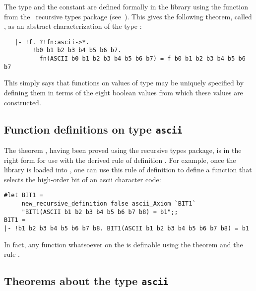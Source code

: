 The type  and the constant  are defined formally in the
library using the function  from the \HOL\ recursive types
package (see~\cite{description,melham}).  This gives the following theorem,
called , as an
abstract characterization of the type :

\begin{hol}
\begin{verbatim}
   |- !f. ?!fn:ascii->*.
        !b0 b1 b2 b3 b4 b5 b6 b7.
          fn(ASCII b0 b1 b2 b3 b4 b5 b6 b7) = f b0 b1 b2 b3 b4 b5 b6 b7
\end{verbatim}\end{hol}

\noindent This simply says that functions on values of type  may be
uniquely specified by defining them in terms of the eight boolean values from
which these values are constructed. 

\subsection{Function definitions on type {\tt ascii}}%

The theorem , having been proved using the recursive types
package, is in the right form for use with the derived rule of definition
.  For example, once the  library is
loaded into \HOL, one can use this rule of definition to define a function that
selects the high-order bit of an ascii character code:

\setcounter{sessioncount}{1}
\begin{session}\begin{verbatim}
#let BIT1 = 
     new_recursive_definition false ascii_Axiom `BIT1` 
     "BIT1(ASCII b1 b2 b3 b4 b5 b6 b7 b8) = b1";;
BIT1 = 
|- !b1 b2 b3 b4 b5 b6 b7 b8. BIT1(ASCII b1 b2 b3 b4 b5 b6 b7 b8) = b1
\end{verbatim}\end{session}

\noindent In fact, any function whatsoever on the  is definable
using the theorem  and the rule
.  

\subsection{Theorems about the type {\tt ascii}}%

